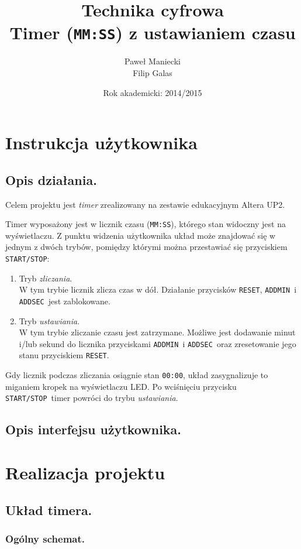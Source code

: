 \documentclass[a4paper,oneside]{report}
\title{
	\textbf{Technika cyfrowa}
	\\
	Timer (\texttt{MM:SS}) z ustawianiem czasu
	}
\author{
	Paweł Maniecki\\
	Filip Galas
	}
\date{Rok akademicki: 2014/2015}
\newcommand{\startstop}{\texttt{START/STOP}}
\newcommand{\reset}{\texttt{RESET}}
\newcommand{\addmin}{\texttt{ADD\textunderscore MIN}}
\newcommand{\addsec}{\texttt{ADD\textunderscore SEC}}
\begin{document}
\maketitle

\tableofcontents
\listoffigures

\chapter{Instrukcja użytkownika}
\section{Opis działania.}
Celem projektu jest \emph{timer} zrealizowany na zestawie
edukacyjnym Altera UP2.

Timer wyposażony jest w licznik czasu (\texttt{MM:SS}), którego
stan widoczny jest na wyświetlaczu. Z punktu widzenia użytkownika
układ może znajdować się w jednym z dwóch trybów, pomiędzy którymi
można przestawiać się przyciskiem \startstop :
\begin{enumerate}
\item Tryb \emph{zliczania}.\\
W tym trybie licznik zlicza czas w dół. Działanie przycisków
\reset , \addmin\ i \addsec\ jest zablokowane.
\item Tryb \emph{ustawiania}.\\
W tym trybie zliczanie czasu jest zatrzymane. Możliwe jest
dodawanie minut i/lub sekund do licznika przyciskami \addmin\ i
\addsec\ oraz zresetowanie jego stanu przyciskiem \reset .
\end{enumerate}
Gdy licznik podczas zliczania osiągnie stan \texttt{00:00}, układ
zasygnalizuje to miganiem kropek na wyświetlaczu LED. Po
wciśnięciu przycisku \startstop\ timer powróci do trybu
\emph{ustawiania}.
\section{Opis interfejsu użytkownika.}

\chapter{Realizacja projektu}
\section{Układ timera.}
\subsection{Ogólny schemat.}
\end{document}
